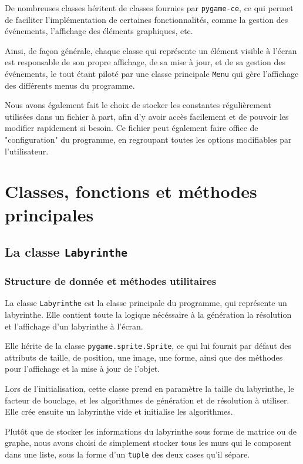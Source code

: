 \documentclass[12pt]{scrreprt} %
\begin{document}
De nombreuses classes héritent de classes fournies par \texttt{pygame-ce}, ce qui permet de faciliter l'implémentation de certaines fonctionnalités, comme la gestion des événements, l'affichage des éléments graphiques, etc.

Ainsi, de façon générale, chaque classe qui représente un élément visible à l'écran est responsable de son propre affichage, de sa mise à jour, et de sa gestion des événements, le tout étant piloté par une classe principale \texttt{Menu} qui gère l'affichage des différents menus du programme.

Nous avons également fait le choix de stocker les constantes régulièrement utilisées dans un fichier à part, afin d'y avoir accès facilement et de pouvoir les modifier rapidement si besoin. Ce fichier peut également faire office de "configuration" du programme, en regroupant toutes les options modifiables par l'utilisateur.

\section{Classes, fonctions et méthodes principales}

\subsection{La classe \texttt{Labyrinthe}}

\subsubsection{Structure de donnée et méthodes utilitaires}

La classe \texttt{Labyrinthe} est la classe principale du programme, qui représente un labyrinthe. Elle contient toute la logique nécéssaire à la génération la résolution et l'affichage d'un labyrinthe à l'écran.

Elle hérite de la classe \texttt{pygame.sprite.Sprite}, ce qui lui fournit par défaut des attributs de taille, de position, une image, une forme, ainsi que des méthodes pour l'affichage et la mise à jour de l'objet.

Lors de l'initialisation, cette classe prend en paramètre la taille du labyrinthe, le facteur de bouclage, et les algorithmes de génération et de résolution à utiliser. Elle crée ensuite un labyrinthe vide et initialise les algorithmes.

Plutôt que de stocker les informations du labyrinthe sous forme de matrice ou de graphe, nous avons choisi de simplement stocker tous les murs qui le composent dans une liste, sous la forme d'un \texttt{tuple} des deux cases qu'il sépare.
\end{document}
